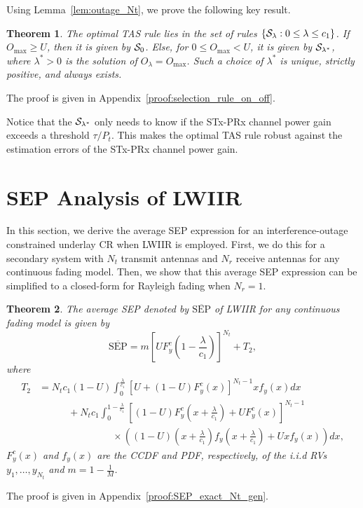 \documentclass[12pt,draftcls,peerreview,onecolumn]{IEEEtran}
\newtheorem{theorem}{{\bf Theorem}}
\newcommand{\set}[1]{\{#1\}}
\newcommand{\SEP}{\text{SEP}}
\newcommand{\lam}{\lambda}
\newcommand{\lamstar}{\lam^{*}}
\newcommand{\termtwo}{T_2}
\newcommand{\Nt}{{N_t}}
\newcommand{\Nr}{{N_r}}
\newcommand{\Pt}{{P_t}}
\newcommand{\outmax}{O_{\text{max}}}
\newcommand{\cone}{c_{1}}
\newcommand{\out}{O}
\newcommand{\m}{\cone}
\newcommand{\lambym}{\frac{\lam}{\m}}
\newcommand{\yk}[1]{y_{#1}}
\newcommand{\un}{U}
\newcommand{\caluncons}{{\cal S_{\text{0}}}}
\newcommand{\callamrule}{{\cal S_{{\lam}}}}
\newcommand{\outlam}{\out_{\lam}}
\newcommand{\callamstarrule}{\cal S_{\lam^{*}}}
\newcommand{\avgSEP}{\overline{\SEP}}
\newcommand{\pdfyNrgen}[1]{f_{y}\left(#1\right)} %
\newcommand{\ccdfy}[1]{F^{c}_{y}\left(#1 \right)}
\newcommand{\unccdfygen}[2]{{#1} \ccdfy{#2}  }
\newcommand{\ccdfyrv}[1]{ F^{c}_{y}\left(#1 \right) }
\begin{document}
Using Lemma~\ref{lem:outage_Nt}, we prove the following key result. 
%
\begin{theorem}
\label{thm:selection_rule_on_off}
The optimal TAS rule lies in the set of rules $\set{\callamrule:0\leq\lam\leq\cone}$. If $\outmax\geq\un$, then it is given by $\caluncons$. Else, for $0\leq\outmax<\un$, it is given by $\callamstarrule$, where $\lamstar>0$  is the solution of $\outlam=\outmax$. Such a choice of $\lamstar$ is unique, strictly positive, and always exists. 
\end{theorem}
%                
\begin{IEEEproof}
   The proof is given in Appendix~\ref{proof:selection_rule_on_off}.
\end{IEEEproof}
%

Notice that the $\callamstarrule$ only needs to know if the STx-PRx channel power gain exceeds a threshold $\tau/\Pt$. This makes the optimal TAS rule robust against the estimation errors of the STx-PRx channel power gain. 

\section{SEP Analysis of LWIIR}
\label{sec:SEPanalysis}
In this section, we derive the average SEP expression for an interference-outage constrained underlay CR when LWIIR is employed. First, we do this for a secondary system with $\Nt$ transmit antennas and $\Nr$ receive antennas for any continuous fading model. Then, we show that this average SEP expression can be simplified to a closed-form for Rayleigh fading when $\Nr=1$.

\begin{theorem}
\label{thm:SEP_exact_Nt_gen}
The average SEP denoted by $\avgSEP$ of LWIIR for any continuous fading model is given by
\begin{equation}
\label{eq:SEP_Nt_gen} 
\avgSEP= m\left[\unccdfygen{\un}{1-\lambym}\right]^{\Nt} + \termtwo,
\end{equation}
%
where
\begin{align}
\label{eq:termtwo_gen}
\termtwo \!&= \Nt\m(1-\un)\int_{0}^{\lambym} \left[\un + \unccdfygen{(1-\un)}{x}\right]^{\Nt-1} x\pdfyNrgen{x} dx\nonumber\\
&\quad\quad\quad+ \Nt\m \int_{0}^{1-\lambym}
\left[\unccdfygen{(1-\un)}{x+\lambym} + \unccdfygen{\un}{x}\right]^{\Nt-1}\nonumber\\
&\hspace{90pt}\times\left((1-\un)\left(x + \lambym\right) \pdfyNrgen{x + \lambym}+\un x\pdfyNrgen{x}\right) dx ,
\end{align}
%
$\ccdfyrv{x}$ and $\pdfyNrgen{x}$ are the CCDF and PDF, respectively, of the i.i.d RVs  $\yk{1},\ldots,\yk{\Nt}$ and $m=1-\frac{1}{M}$.
\end{theorem}
%
\begin{IEEEproof}
The proof is given in Appendix~\ref{proof:SEP_exact_Nt_gen}.
\end{IEEEproof}
%
\end{document}
